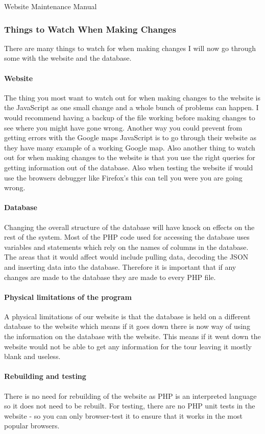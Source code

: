 \documentclass{article}
\begin{document}
\begin{section}{Website Maintenance Manual}
		\subsubsection{Things to Watch When Making Changes}
		There are many things to watch for when making changes I will now go through some with the website and the database.
		
		\paragraph{Website}
		The thing you most want to watch out for when making changes to the website is the JavaScript as one small change and a whole bunch of problems can happen. I would recommend having a backup of the file working before making changes to see where you might have gone wrong. Another way you could prevent from getting errors with the Google maps JavaScript is to go through their website as they have many example of a working Google map. Also another thing to watch out for when making changes to the website is that you use the right queries for getting information out of the database. Also when testing the website if would use the browsers debugger like Firefox’s this can tell you were you are going wrong.

		\paragraph{Database}
		Changing the overall structure of the database will have knock on effects on the rest of the system. Most of the PHP code used for accessing the database uses variables and statements which rely on the names of columns in the database. The areas that it would affect would include pulling data, decoding the JSON and inserting data into the database. Therefore it is important that if any changes are made to the database they are made to every PHP file. 

		\paragraph{Physical limitations of the program}
		A physical limitations of our website is that the database is held on a different database to the website which means if it goes down there is now way of using the information on the database with the website. This means if it went down the website would not be able to get any information for the tour leaving it mostly blank and useless.


		\paragraph{Rebuilding and testing}
			There is no need for rebuilding of the website as PHP is an interpreted language so it does not need to be rebuilt. For testing, there are no PHP unit tests in the website - so you can only browser-test it to ensure that it works in the most popular browsers.
			
	\end{section}
	
\end{document}
